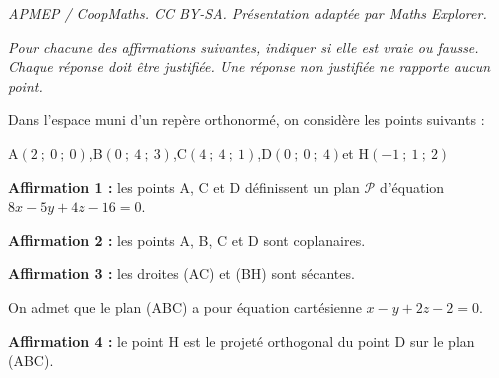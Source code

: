 \documentclass[10pt]{article}
\begin{document}
\noindent\textit{APMEP / CoopMaths. CC BY-SA. Présentation adaptée par Maths Explorer.}\par\medskip
\medskip

\emph{Pour chacune des affirmations suivantes, indiquer si elle est vraie ou fausse. Chaque réponse doit être justifiée. Une réponse non justifiée ne rapporte aucun point.}

\medskip

Dans l'espace muni d'un repère orthonormé, on considère les points suivants :

\begin{center}
	A$(2~;~0 ~;~0)$,\qquad B$(0 ~;~4~;~3)$,\qquad C$(4 ~;~4 ~;~1)$,\qquad D$(0 ~;~0 ~;~4)$\quad et \quad H$(-1~;~1~;~2)$
\end{center}

\smallskip

\textbf{Affirmation 1 :} les points A, C et D définissent un plan $\mathcal{P}$ d'équation $8 x- 5 y+ 4z - 16 = 0$.

\medskip

\textbf{Affirmation 2 :} les points A, B, C et D sont coplanaires.

\medskip

\textbf{Affirmation 3 :} les droites (AC) et (BH) sont sécantes.

\bigskip

On admet que le plan (ABC) a pour équation cartésienne $x - y + 2z - 2 = 0$.

\smallskip

\textbf{Affirmation 4 :} le point H est le projeté orthogonal du point D sur le plan (ABC).
\end{document}
